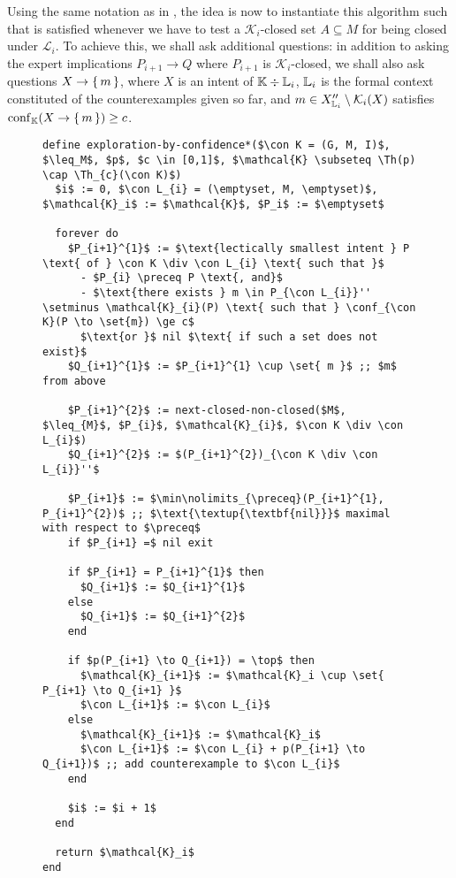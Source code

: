 Using the same notation as in , the idea is
now to instantiate this algorithm such that  is satisfied whenever we have to
test a $\mathcal{K}_{i}$-closed set $A \subseteq M$ for being closed under
$\mathcal{L}_{i}$.  To achieve this, we shall ask additional questions: in addition to
asking the expert implications $P_{i+1} \to Q$ where $P_{i+1}$ is
$\mathcal{K}_{i}$-closed, we shall also ask questions $X \to {\ensuremath{\{\,m\,\}}}$, where $X$ is an
intent of ${\mathbb{K}} \div {\ensuremath{\mathbb{L}}}_{i}$, ${\mathbb{L}}_{i}$ is the formal context constituted of the
counterexamples given so far, and $m \in X_{{\mathbb{L}}_{i}}'' \setminus \mathcal{K}_{i}(X)$
satisfies $\operatorname{conf}_{{\mathbb{K}}}(X \to {\ensuremath{\{\,m\,\}}}) \ge c$.


\begin{figure}[tp]
  \begin{Algorithm}
    \label{alg:exploration-by-confidence-without-Th_c(K)-closures}
    \hspace*{0cm}
\begin{lstlisting}
define exploration-by-confidence*($\con K = (G, M, I)$, $\leq_M$, $p$, $c \in [0,1]$, $\mathcal{K} \subseteq \Th(p) \cap \Th_{c}(\con K)$)
  $i$ := 0, $\con L_{i} = (\emptyset, M, \emptyset)$, $\mathcal{K}_i$ := $\mathcal{K}$, $P_i$ := $\emptyset$

  forever do
    $P_{i+1}^{1}$ := $\text{lectically smallest intent } P \text{ of } \con K \div \con L_{i} \text{ such that }$
      - $P_{i} \preceq P \text{, and}$
      - $\text{there exists } m \in P_{\con L_{i}}'' \setminus \mathcal{K}_{i}(P) \text{ such that } \conf_{\con K}(P \to \set{m}) \ge c$
      $\text{or }$ nil $\text{ if such a set does not exist}$
    $Q_{i+1}^{1}$ := $P_{i+1}^{1} \cup \set{ m }$ ;; $m$ from above

    $P_{i+1}^{2}$ := next-closed-non-closed($M$, $\leq_{M}$, $P_{i}$, $\mathcal{K}_{i}$, $\con K \div \con L_{i}$)
    $Q_{i+1}^{2}$ := $(P_{i+1}^{2})_{\con K \div \con L_{i}}''$

    $P_{i+1}$ := $\min\nolimits_{\preceq}(P_{i+1}^{1}, P_{i+1}^{2})$ ;; $\text{\textup{\textbf{nil}}}$ maximal with respect to $\preceq$
    if $P_{i+1} =$ nil exit

    if $P_{i+1} = P_{i+1}^{1}$ then
      $Q_{i+1}$ := $Q_{i+1}^{1}$
    else
      $Q_{i+1}$ := $Q_{i+1}^{2}$
    end

    if $p(P_{i+1} \to Q_{i+1}) = \top$ then
      $\mathcal{K}_{i+1}$ := $\mathcal{K}_i \cup \set{ P_{i+1} \to Q_{i+1} }$
      $\con L_{i+1}$ := $\con L_{i}$
    else
      $\mathcal{K}_{i+1}$ := $\mathcal{K}_i$
      $\con L_{i+1}$ := $\con L_{i} + p(P_{i+1} \to Q_{i+1})$ ;; add counterexample to $\con L_{i}$
    end

    $i$ := $i + 1$
  end

  return $\mathcal{K}_i$  
end
\end{lstlisting}
  \end{Algorithm}
\end{figure}

